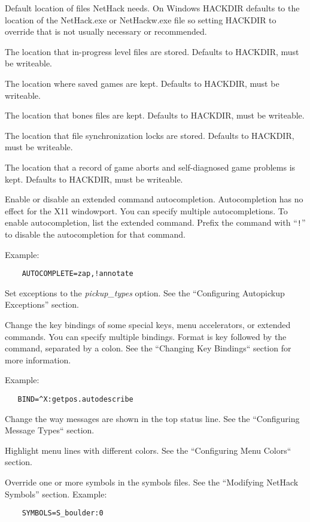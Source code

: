 \item[\bb{HACKDIR}]
Default location of files NetHack needs. On Windows HACKDIR
defaults to the location of the NetHack.exe or NetHackw.exe file
so setting HACKDIR to override that is not usually necessary or recommended.
\item[\bb{LEVELDIR}]
The location that in-progress level files are stored. Defaults to HACKDIR,
must be writeable.
\item[\bb{SAVEDIR}]
The location where saved games are kept. Defaults to HACKDIR, must be
writeable.
\item[\bb{BONESDIR}]
The location that bones files are kept. Defaults to HACKDIR, must be
writeable.
\item[\bb{LOCKDIR}]
The location that file synchronization locks are stored. Defaults to
HACKDIR, must be writeable.
\item[\bb{TROUBLEDIR}]
The location that a record of game aborts and self-diagnosed game problems
is kept. Defaults to HACKDIR, must be writeable.
\item[\bb{AUTOCOMPLETE}]
Enable or disable an extended command autocompletion.
Autocompletion has no effect for the X11 windowport.
You can specify multiple autocompletions. To enable
autocompletion, list the extended command. Prefix the
command with ``{{\tt !}}'' to disable the autocompletion
for that command.

Example:
\begin{verbatim}
    AUTOCOMPLETE=zap,!annotate
\end{verbatim}

\item[\bb{AUTOPICKUP\_EXCEPTION}]
Set exceptions to the {{\it pickup\_types\/}}
option. See the ``Configuring Autopickup Exceptions'' section.
\item[\bb{BINDINGS}]
Change the key bindings of some special keys, menu accelerators, or
extended commands. You can specify multiple bindings. Format is key
followed by the command, separated by a colon.
See the ``Changing Key Bindings`` section for more information.

Example:
\begin{verbatim}
   BIND=^X:getpos.autodescribe
\end{verbatim}

\item[\bb{MSGTYPE}]
Change the way messages are shown in the top status line.
See the ``Configuring Message Types`` section.
\item[\bb{MENUCOLOR}]
Highlight menu lines with different colors.
See the ``Configuring Menu Colors`` section.
\item[\bb{SYMBOLS}]
Override one or more symbols in the symbols files.
See the ``Modifying NetHack Symbols'' section.
Example:
\begin{verbatim}
    SYMBOLS=S_boulder:0
\end{verbatim}

